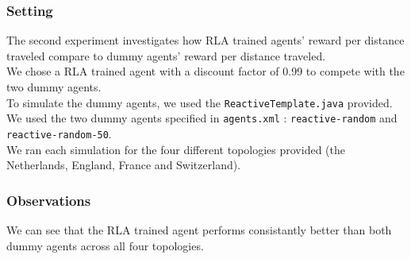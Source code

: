 \documentclass[11pt]{article}
\begin{document}
\subsubsection{Setting}
The second experiment investigates how RLA trained agents' reward per distance traveled compare to dummy agents' reward per distance traveled.\\

We chose a RLA trained agent with a discount factor of 0.99 to compete with the two dummy agents.\\

To simulate the dummy agents, we used the \texttt{ReactiveTemplate.java} provided. We used the two dummy agents specified in \texttt{agents.xml} : \texttt{reactive-random} and \texttt{reactive-random-50}.\\

We ran each simulation for the four different topologies provided (the Netherlands, England, France and Switzerland).\\

\subsubsection{Observations}
We can see that the RLA trained agent performs consistantly better than both dummy agents across all four topologies.\\
\end{document}
